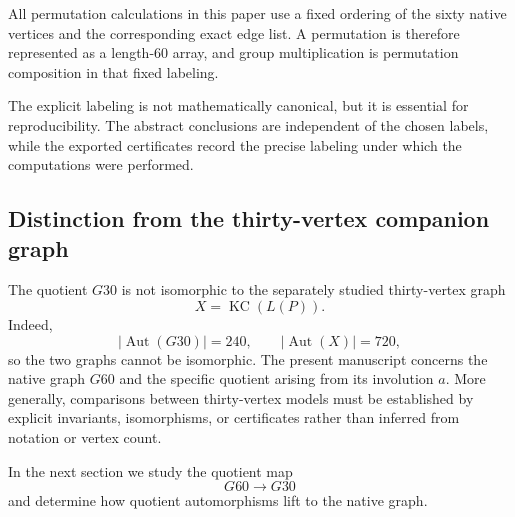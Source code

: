 All permutation calculations in this paper use a fixed ordering of the
sixty native vertices and the corresponding exact edge list. A
permutation is therefore represented as a length-$60$ array, and group
multiplication is permutation composition in that fixed labeling.

The explicit labeling is not mathematically canonical, but it is
essential for reproducibility. The abstract conclusions are independent
of the chosen labels, while the exported certificates record the precise
labeling under which the computations were performed.

\subsection{Distinction from the thirty-vertex companion graph}

The quotient $G30$ is not isomorphic to the separately studied
thirty-vertex graph
\[
X=\operatorname{KC}(L(P)).
\]
Indeed,
\[
\left|\operatorname{Aut}(G30)\right|=240,
\qquad
\left|\operatorname{Aut}(X)\right|=720,
\]
so the two graphs cannot be isomorphic. The present manuscript concerns
the native graph $G60$ and the specific quotient arising from its
involution $a$. More generally, comparisons between thirty-vertex models
must be established by explicit invariants, isomorphisms, or certificates
rather than inferred from notation or vertex count.

In the next section we study the quotient map
\[
G60\longrightarrow G30
\]
and determine how quotient automorphisms lift to the native graph.
